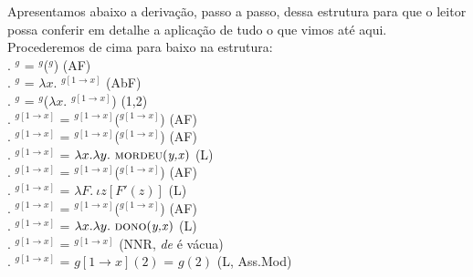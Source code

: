 \n Apresentamos abaixo a derivação, passo a passo, dessa estrutura para que o leitor possa conferir em detalhe a aplicação de tudo o que vimos até aqui. Procederemos de cima para baixo na estrutura:\\

. $^{g}$ = $^{g}$($^{g}$) \hfill (AF)\\

. $^{g}$ = $\lambda x.$ $^{g[1 \rightarrow x]}$
\hfill (AbF)\\

. $^{g}$ = $^{g}$($\lambda x.$ $^{g[1 \rightarrow x]}$) \hfill (1,2)\\

. $^{g[1 \rightarrow x]}$ = $^{g[1 \rightarrow x]}$($^{g[1 \rightarrow x]}$)
\hfill
(AF)\\

. $^{g[1 \rightarrow x]}$ =
$^{g[1 \rightarrow x]}$($^{g[1 \rightarrow x]}$) \hfill (AF)\\

. $^{g[1 \rightarrow x]}$ = $\lambda x.\lambda y.\ \predica{mordeu}{y,x}$ \hfill (L)\\

. $^{g[1 \rightarrow x]}$ = $^{g[1
\rightarrow x]}$($^{g[1 \rightarrow x]}$) \hfill
(AF)\\

. $^{g[1 \rightarrow x]}$ = $\lambda F.\ \iota z[F'(z)]$ \hfill (L)\\

. $^{g[1 \rightarrow x]}$ = $^{g[1
\rightarrow x]}$($^{g[1 \rightarrow x]}$) \hfill (AF)\\

. $^{g[1 \rightarrow x]}$ = $\lambda x.\lambda y.\ \predica{dono}{y,x}$ \hfill (L)\\

. $^{g[1 \rightarrow x]}$ = $^{g[1
\rightarrow x]}$ \hfill (NNR, \textit{de} é vácua)\\

. $^{g[1 \rightarrow x]}$ = $g[1 \rightarrow x](2)$ = $g(2)$ \hfill (L,
Ass.Mod)\\

